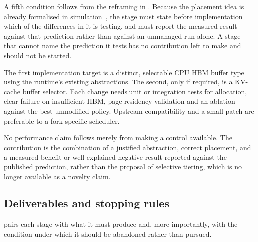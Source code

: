 A fifth condition follows from the reframing in
.  Because the placement idea is already
formalised in simulation~\cite{fang2025kvplacement}, the stage must
state before implementation which of the differences in
 it is testing, and must report the measured
result against that prediction rather than against an unmanaged run
alone.  A stage that cannot name the prediction it tests has no
contribution left to make and should not be started.

The first implementation target is a distinct, selectable CPU HBM
buffer type using the runtime's existing abstractions.  The second,
only if required, is a KV-cache buffer selector.  Each change needs unit
or integration tests for allocation, clear failure on insufficient HBM,
page-residency validation and an ablation against the best unmodified
policy.  Upstream compatibility and a small patch are preferable to a
fork-specific scheduler.

No performance claim follows merely from making a control available.
The contribution is the combination of a justified abstraction, correct
placement, and a measured benefit or well-explained negative result
reported against the published prediction, rather than the proposal of
selective tiering, which is no longer available as a novelty claim.

\subsection{Deliverables and stopping rules}

 pairs each stage with what it must produce
and, more importantly, with the condition under which it should be
abandoned rather than pursued.

